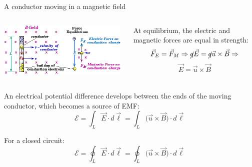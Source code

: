 %
%
%

\begin{frame}{A conductor moving in a magnetic field}

\begin{columns}
  \begin{column}{0.45\textwidth}
    \includegraphics[width=0.98\textwidth]{./images/schematics/conductor_in_magnetic_field_induced_emf.png}\\
  \end{column}
  \begin{column}{0.55\textwidth}
    At equilibrium, the electric and magnetic forces are equal in strength:
    \begin{equation*}
      \vec{F}_{E} =  \vec{F}_{M} \Rightarrow
       \cancel{q} \vec{E} = \cancel{q} \vec{u} \times \vec{B} \Rightarrow
     \end{equation*}
     \begin{equation*}
       \vec{E} = \vec{u} \times \vec{B}
     \end{equation*}
  \end{column}
\end{columns}

\vspace{0.4cm}

An electrical potential difference develops between the ends of the moving conductor,
which becomes a source of EMF:
\begin{equation*}
   \mathcal{E} = \int_{L} \vec{E} \cdot d\vec{\ell} = \int_{L} \Big( \vec{u} \times \vec{B} \Big) \cdot d\vec{\ell}
\end{equation*}

For a closed circuit:
\begin{equation*}
   \mathcal{E} = \oint_{L} \vec{E} \cdot d\vec{\ell} = \oint_{L} \Big( \vec{u} \times \vec{B} \Big) \cdot d\vec{\ell}
\end{equation*}

\end{frame}


